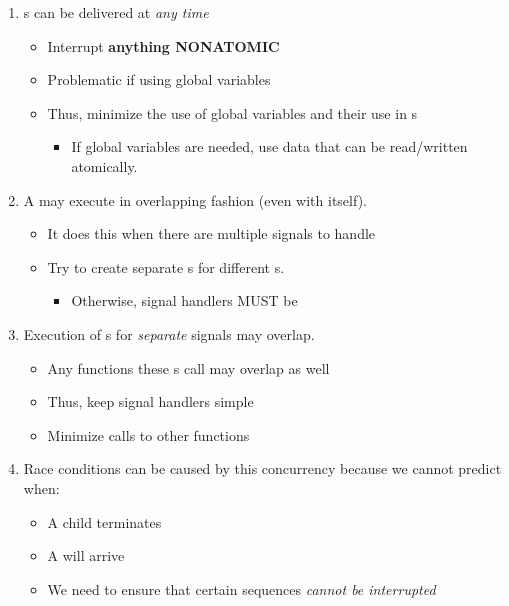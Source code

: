 \begin{enumerate}[noitemsep]
\item {}s can be delivered at \emph{any time}
  \begin{itemize}[noitemsep]
  \item Interrupt \textbf{anything NONATOMIC}
  \item Problematic if using global variables
  \item Thus, minimize the use of global variables and their use in s
    \begin{itemize}[noitemsep]
    \item If global variables are needed, use data that can be read/written atomically.
    \end{itemize}
  \end{itemize}
\item A  may execute in overlapping fashion (even with itself).
  \begin{itemize}[noitemsep]
  \item It does this when there are multiple signals to handle
  \item Try to create separate s for different s.
    \begin{itemize}[noitemsep]
    \item Otherwise, signal handlers MUST be \textit{}
    \end{itemize}
  \end{itemize}
\item Execution of s for \textit{separate} signals may overlap.
  \begin{itemize}[noitemsep]
  \item Any functions these s call may overlap as well
  \item Thus, keep signal handlers simple
  \item Minimize calls to other functions
  \end{itemize}
\item Race conditions can be caused by this concurrency because we cannot predict when:
  \begin{itemize}[noitemsep]
  \item A child terminates
  \item A  will arrive
  \item We need to ensure that certain sequences \textit{cannot be interrupted}
  \end{itemize}
\end{enumerate}


